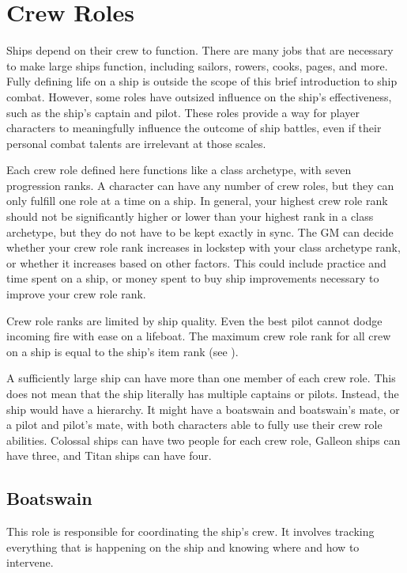 \section{Crew Roles}
  Ships depend on their crew to function.
  There are many jobs that are necessary to make large ships function, including sailors, rowers, cooks, pages, and more.
  Fully defining life on a ship is outside the scope of this brief introduction to ship combat.
  However, some roles have outsized influence on the ship's effectiveness, such as the ship's captain and pilot.
  These roles provide a way for player characters to meaningfully influence the outcome of ship battles, even if their personal combat talents are irrelevant at those scales.

  Each crew role defined here functions like a class archetype, with seven progression ranks.
  A character can have any number of crew roles, but they can only fulfill one role at a time on a ship.
  In general, your highest crew role rank should not be significantly higher or lower than your highest rank in a class archetype, but they do not have to be kept exactly in sync.
  The GM can decide whether your crew role rank increases in lockstep with your class archetype rank, or whether it increases based on other factors.
  This could include practice and time spent on a ship, or money spent to buy ship improvements necessary to improve your crew role rank.

  Crew role ranks are limited by ship quality.
  Even the best pilot cannot dodge incoming fire with ease on a lifeboat.
  The maximum crew role rank for all crew on a ship is equal to the ship's item rank (see ).

  A sufficiently large ship can have more than one member of each crew role.
  This does not mean that the ship literally has multiple captains or pilots.
  Instead, the ship would have a hierarchy.
  It might have a boatswain and boatswain's mate, or a pilot and pilot's mate, with both characters able to fully use their crew role abilities.
  Colossal ships can have two people for each crew role, Galleon ships can have three, and Titan ships can have four.


  \subsection{Boatswain}
    This role is responsible for coordinating the ship's crew.
    It involves tracking everything that is happening on the ship and knowing where and how to intervene.


